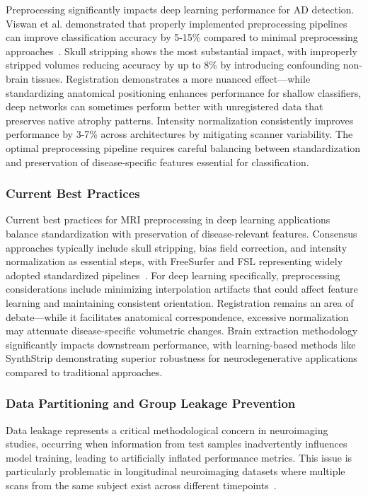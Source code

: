 \documentclass[12pt, a4paper]{article}
\begin{document}
Preprocessing significantly impacts deep learning performance for AD detection. Viswan et al. demonstrated that properly implemented preprocessing pipelines can improve classification accuracy by 5-15\% compared to minimal preprocessing approaches~\cite{viswan2025enhancing}. Skull stripping shows the most substantial impact, with improperly stripped volumes reducing accuracy by up to 8\% by introducing confounding non-brain tissues. Registration demonstrates a more nuanced effect—while standardizing anatomical positioning enhances performance for shallow classifiers, deep networks can sometimes perform better with unregistered data that preserves native atrophy patterns. Intensity normalization consistently improves performance by 3-7\% across architectures by mitigating scanner variability. The optimal preprocessing pipeline requires careful balancing between standardization and preservation of disease-specific features essential for classification.

\subsubsection{Current Best Practices}

Current best practices for MRI preprocessing in deep learning applications balance standardization with preservation of disease-relevant features. Consensus approaches typically include skull stripping, bias field correction, and intensity normalization as essential steps, with FreeSurfer and FSL representing widely adopted standardized pipelines~\cite{viswan2025enhancing}. For deep learning specifically, preprocessing considerations include minimizing interpolation artifacts that could affect feature learning and maintaining consistent orientation. Registration remains an area of debate—while it facilitates anatomical correspondence, excessive normalization may attenuate disease-specific volumetric changes. Brain extraction methodology significantly impacts downstream performance, with learning-based methods like SynthStrip demonstrating superior robustness for neurodegenerative applications compared to traditional approaches.

\subsubsection{Data Partitioning and Group Leakage Prevention}

Data leakage represents a critical methodological concern in neuroimaging studies, occurring when information from test samples inadvertently influences model training, leading to artificially inflated performance metrics. This issue is particularly problematic in longitudinal neuroimaging datasets where multiple scans from the same subject exist across different timepoints~\cite{davatzikos2019machine}.
\end{document}
